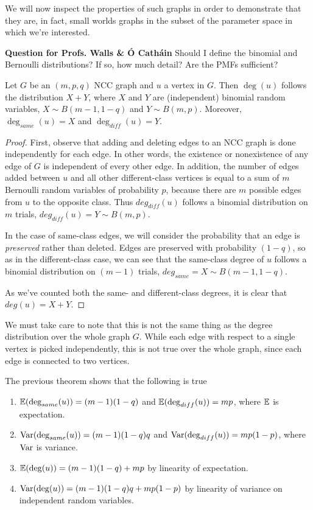 We will now inspect the properties of such graphs in order to demonstrate that they are, in fact,
small worlds graphs in the subset of the parameter space in which we're interested.

\textbf{Question for Profs. Walls \& \'O Cath\'ain} Should I define the binomial and Bernoulli
distributions? If so, how much detail? Are the PMFs sufficient?

\begin{theorem}
  \label{thm:ncc_deg}
  Let $G$ be an $(m,p,q)$ NCC graph and $u$ a vertex in $G$. Then $\deg(u)$ follows the distribution
  $X + Y$, where $X$ and $Y$ are (independent) binomial random variables, $X \sim B(m-1,1-q)$ and
  $Y \sim B(m,p)$. Moreover, $\deg_{same}(u) = X$ and $\deg_{diff}(u) = Y$.
\end{theorem}
\begin{proof}
  First, observe that adding and deleting edges to an NCC graph is done independently for each edge.
  In other words, the existence or nonexistence of any edge of $G$ is independent of every other edge.
  In addition, the number of edges added between $u$ and all other different-class vertices is equal
  to a sum of $m$ Bernoulli random variables of probability $p$, because there are $m$ possible edges
  from $u$ to the opposite class. Thus $deg_{diff}(u)$ follows a binomial distribution on $m$ trials,
  $deg_{diff}(u) = Y \sim B(m,p)$.

  In the case of same-class edges, we will consider the probability that an edge is \textit{preserved}
  rather than deleted. Edges are preserved with probability $(1-q)$, so as in the different-class
  case, we can see that the same-class degree of $u$ follows a binomial distribution on $(m-1)$
  trials, $deg_{same} = X \sim B(m-1,1-q)$.

  As we've counted both the same- and different-class degrees, it is clear that $deg(u) = X + Y$.
\end{proof}

We must take care to note that this is not the same thing as the degree distribution over the whole
graph $G$. While each edge with respect to a single vertex is picked independently, this is not true
over the whole graph, since each edge is connected to two vertices.

\begin{remark}
  The previous theorem shows that the following is true
  \begin{enumerate}
  \item $\mathbb{E}(\deg_{same}(u)) = (m-1)(1-q)$ and $\mathbb{E}(\deg_{diff}(u)) = mp$, where $\mathbb{E}$ is expectation.
  \item $\mathrm{Var}(\deg_{same}(u)) = (m-1)(1-q)q$ and $\mathrm{Var}(\deg_{diff}(u)) = mp(1-p)$, where $\mathrm{Var}$ is
    variance.
  \item $\mathbb{E}(\deg(u)) = (m-1)(1-q) + mp$ by linearity of expectation.
  \item $\mathrm{Var}(\deg(u)) = (m-1)(1-q)q + mp(1-p)$ by linearity of variance on independent random
    variables.
  \end{enumerate}
\end{remark}


